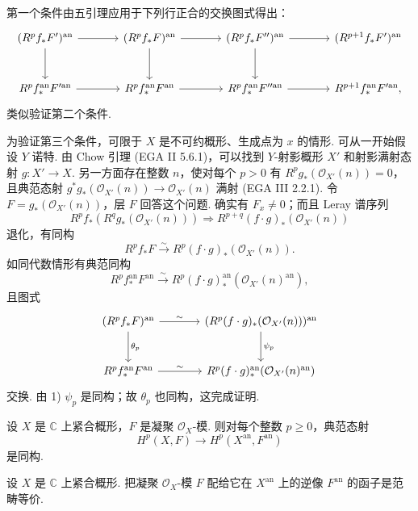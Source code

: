 第一个条件由五引理应用于下列行正合的交换图式得出：
\[
\begin{tikzcd}[row sep=large, column sep=large]
(R^p f_* F')^{\mathrm{an}} \arrow[r] \arrow[d] & (R^p f_* F)^{\mathrm{an}} \arrow[r] \arrow[d] & (R^p f_* F'')^{\mathrm{an}} \arrow[r] \arrow[d] & (R^{p+1} f_* F')^{\mathrm{an}} \\
R^p f_*^{\mathrm{an}} F'^{\mathrm{an}} \arrow[r] & R^p f_*^{\mathrm{an}} F^{\mathrm{an}} \arrow[r] & R^p f_*^{\mathrm{an}} F''^{\mathrm{an}} \arrow[r] & R^{p+1} f_*^{\mathrm{an}} F'^{\mathrm{an}},
\end{tikzcd}
\]
类似验证第二个条件.

为验证第三个条件，可限于 $X$ 是不可约概形、生成点为 $x$ 的情形. 可从一开始假设 $Y$ 诺特. 由 Chow 引理 (EGA II 5.6.1)，可以找到 $Y$-射影概形 $X'$ 和射影满射态射 $g \colon X' \to X$. 另一方面存在整数 $n$，使对每个 $p > 0$ 有 $R^p g_*(\mathcal{O}_{X'}(n)) = 0$，且典范态射 $g^{*} g_*(\mathcal{O}_{X'}(n)) \to \mathcal{O}_{X'}(n)$ 满射 (EGA III 2.2.1). 令 $F = g_*(\mathcal{O}_{X'}(n))$，层 $F$ 回答这个问题. 确实有 $F_x \neq 0$；而且 Leray 谱序列
\[
R^p f_*(R^q g_*(\mathcal{O}_{X'}(n))) \Longrightarrow R^{p+q} (f \cdot g)_* (\mathcal{O}_{X'}(n))
\]
退化，有同构
\[
R^p f_* F \xrightarrow{\sim} R^p (f \cdot g)_* (\mathcal{O}_{X'}(n)).
\]
如同代数情形有典范同构
\[
R^p f_*^{\mathrm{an}} F^{\mathrm{an}} \xrightarrow{\sim} R^p (f \cdot g)^{\mathrm{an}}_* (\mathcal{O}_{X'}(n)^{\mathrm{an}}),
\]
且图式
\[
\begin{tikzcd}[row sep=large, column sep=large]
(R^p f_* F)^{\mathrm{an}} \arrow[r,"{\sim}"] \arrow[d,"{\theta_p}"] & (R^p (f \cdot g)_* (\mathcal{O}_{X'}(n)))^{\mathrm{an}} \arrow[d,"{\psi_p}"] \\
R^p f_*^{\mathrm{an}} F^{\mathrm{an}} \arrow[r,"{\sim}"] & R^p (f \cdot g)^{\mathrm{an}}_* (\mathcal{O}_{X'}(n)^{\mathrm{an}})
\end{tikzcd}
\]
交换. 由 1) $\psi_p$ 是同构；故 $\theta_p$ 也同构，这完成证明.

\begin{corollary}\label{cor:XII.4.3}
设 $X$ 是 $\mathbb{C}$ 上紧合概形，$F$ 是凝聚 $\mathcal{O}_X$-模. 则对每个整数 $p \geqslant 0$，典范态射
\[
H^p(X, F) \longrightarrow H^p(X^{\mathrm{an}}, F^{\mathrm{an}})
\]
是同构.
\end{corollary}

\begin{theorem}\label{thm:XII.4.4}
设 $X$ 是 $\mathbb{C}$ 上紧合概形. 把凝聚 $\mathcal{O}_X$-模 $F$ 配给它在 $X^{\mathrm{an}}$ 上的逆像 $F^{\mathrm{an}}$ 的函子是范畴等价.
\end{theorem}

